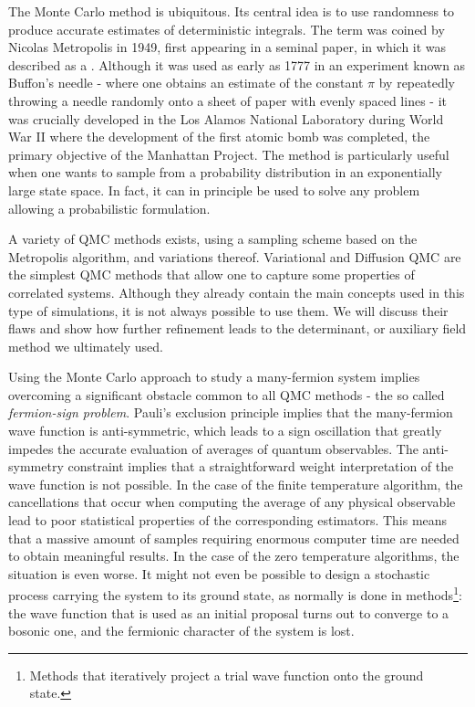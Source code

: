 The Monte Carlo method is ubiquitous.
Its central idea is to use randomness to produce accurate estimates of deterministic integrals.
The term was coined by Nicolas Metropolis in 1949, first appearing in a seminal paper, in which it was described as a \cite{metropolis_monte_1949}.
Although it was used as early as 1777 in an experiment known as Buffon's needle - where one obtains an estimate of the constant $\pi$ by repeatedly throwing a needle randomly onto a sheet of paper with evenly spaced lines - it was crucially developed in the Los Alamos National Laboratory during World War II where the development of the first atomic bomb was completed, the primary objective of the Manhattan Project.
The method is particularly useful when one wants to sample from a probability distribution in an exponentially large state space.
In fact, it can in principle be used to solve any problem allowing a probabilistic formulation.

A variety of \acf{QMC} methods exists, using a sampling scheme based on the Metropolis algorithm, and variations thereof.
Variational and Diffusion \ac{QMC} are the simplest \ac{QMC} methods that allow one to capture some properties of correlated systems.
Although they already contain the main concepts used in this type of simulations, it is not always possible to use them. 
We will discuss their flaws and show how further refinement leads to the determinant, or auxiliary field method we ultimately used.

Using the Monte Carlo approach to study a many-fermion system implies overcoming a significant obstacle common to all \ac{QMC} methods - the so called \emph{fermion-sign problem}.
Pauli's exclusion principle implies that the many-fermion wave function is anti-symmetric, which leads to a sign oscillation that greatly impedes the accurate evaluation of averages of quantum observables.
The anti-symmetry constraint implies that a  straightforward weight interpretation of the wave function is not possible.
In the case of the finite temperature algorithm, the cancellations that occur when computing the average of any physical observable lead to poor statistical properties of the corresponding estimators.
This means that a massive amount of samples requiring enormous computer time are needed to obtain meaningful results.
In the case of the zero temperature algorithms, the situation is even worse.
It might not even be possible to design a stochastic process carrying the system to its ground state, as normally is done in  methods\footnote{Methods that iteratively project a trial wave function onto the ground state.}: the wave function that is used as an initial proposal turns out to converge to a bosonic one, and the fermionic character of the system is lost.

